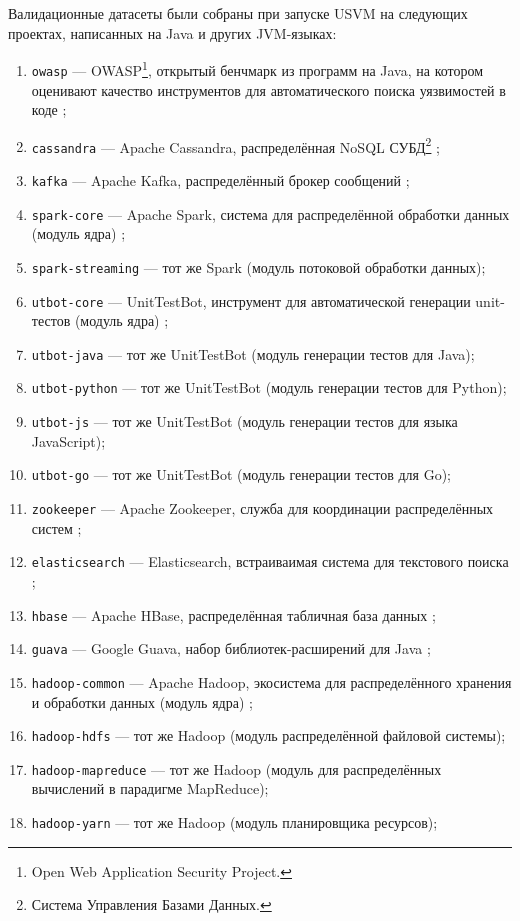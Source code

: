 Валидационные датасеты были собраны при запуске USVM на следующих проектах, написанных на Java и других JVM-языках:

\begin{enumerate}
    \item \texttt{owasp} --- OWASP\footnote{Open Web Application Security Project.}, открытый бенчмарк из программ на Java, на котором оценивают качество инструментов для автоматического поиска уязвимостей в коде \cite{owasp-website};
    \item \texttt{cassandra} --- Apache Cassandra, распределённая NoSQL СУБД\footnote{Система Управления Базами Данных.} \cite{cassandra-website};
    \item \texttt{kafka} --- Apache Kafka, распределённый брокер сообщений \cite{kafka-website};
    \item \texttt{spark-core} --- Apache Spark, система для распределённой обработки данных (модуль ядра) \cite{spark-website};
    \item \texttt{spark-streaming} --- тот же Spark (модуль потоковой обработки данных);
    \item \texttt{utbot-core} --- UnitTestBot, инструмент для автоматической генерации unit-тестов (модуль ядра) \cite{utbot-github};
    \item \texttt{utbot-java} --- тот же UnitTestBot (модуль генерации тестов для Java);
    \item \texttt{utbot-python} --- тот же UnitTestBot (модуль генерации тестов для Python);
    \item \texttt{utbot-js} --- тот же UnitTestBot (модуль генерации тестов для языка JavaScript);
    \item \texttt{utbot-go} --- тот же UnitTestBot (модуль генерации тестов для Go);
    \item \texttt{zookeeper} --- Apache Zookeeper, служба для координации распределённых систем \cite{zookeeper-website};
    \item \texttt{elasticsearch} --- Elasticsearch, встраиваимая система для текстового поиска \cite{elasticsearch-website};
    \item \texttt{hbase} --- Apache HBase, распределённая табличная база данных \cite{hbase-website};
    \item \texttt{guava} --- Google Guava, набор библиотек-расширений для Java \cite{guava-website};
    \item \texttt{hadoop-common} --- Apache Hadoop, экосистема для распределённого хранения и обработки данных (модуль ядра) \cite{hadoop-website};
    \item \texttt{hadoop-hdfs} --- тот же Hadoop (модуль распределённой файловой системы);
    \item \texttt{hadoop-mapreduce} --- тот же Hadoop (модуль для распределённых вычислений в парадигме MapReduce);
    \item \texttt{hadoop-yarn} --- тот же Hadoop (модуль планировщика ресурсов);
\end{enumerate}

